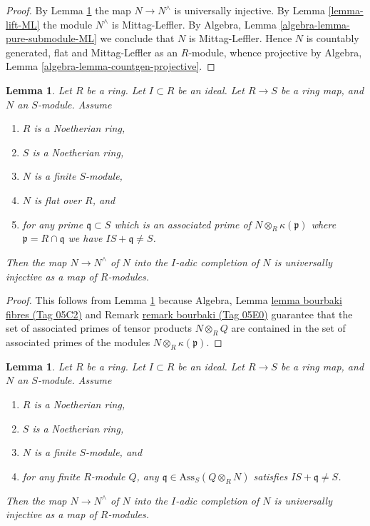 \documentclass{amsart}
\theoremstyle{plain}
\newtheorem{lemma}[subsection]{Lemma}
\theoremstyle{definition}
\theoremstyle{remark}
\numberwithin{equation}{subsection}
\begin{document}
\begin{proof}
By
Lemma \ref{lemma-universally-injective-to-completion-flat}
the map $N \to N^\wedge$ is universally injective.
By
Lemma \ref{lemma-lift-ML}
the module $N^\wedge$ is Mittag-Leffler.
By
Algebra, Lemma \ref{algebra-lemma-pure-submodule-ML}
we conclude that $N$ is Mittag-Leffler.
Hence $N$ is countably generated, flat and Mittag-Leffler as an $R$-module,
whence projective by
Algebra, Lemma \ref{algebra-lemma-countgen-projective}.
\end{proof}


\begin{lemma}
\label{lemma-universally-injective-to-completion-flat}
Let $R$ be a ring.
Let $I \subset R$ be an ideal.
Let $R \to S$ be a ring map, and $N$ an $S$-module.
Assume
\begin{enumerate}
\item $R$ is a Noetherian ring,
\item $S$ is a Noetherian ring,
\item $N$ is a finite $S$-module,
\item $N$ is flat over $R$, and
\item for any prime $\mathfrak q \subset S$ which is an associated prime of
$N \otimes_R \kappa(\mathfrak p)$ where $\mathfrak p = R \cap \mathfrak q$
we have $IS + \mathfrak q \not = S$.
\end{enumerate}
Then the map $N \to N^\wedge$ of $N$ into the $I$-adic completion of $N$
is universally injective as a map of $R$-modules.
\end{lemma}

\begin{proof}
This follows from
Lemma \ref{lemma-universally-injective-to-completion}
because
Algebra, Lemma
\href{https://stacks.math.columbia.edu/tag/05C2}{lemma bourbaki fibres (Tag 05C2)} and
Remark \href{https://stacks.math.columbia.edu/tag/05E0}{remark bourbaki (Tag 05E0)}
guarantee that the set of associated primes of tensor products
$N \otimes_R Q$ are contained in the set of associated primes of
the modules $N \otimes_R \kappa(\mathfrak p)$.
\end{proof}


\begin{lemma}
\label{lemma-universally-injective-to-completion}
Let $R$ be a ring.
Let $I \subset R$ be an ideal.
Let $R \to S$ be a ring map, and $N$ an $S$-module.
Assume
\begin{enumerate}
\item $R$ is a Noetherian ring,
\item $S$ is a Noetherian ring,
\item $N$ is a finite $S$-module, and
\item for any finite $R$-module $Q$, any
$\mathfrak q \in \text{Ass}_S(Q \otimes_R N)$
satisfies $IS + \mathfrak q \not = S$.
\end{enumerate}
Then the map $N \to N^\wedge$ of $N$ into the $I$-adic completion of $N$
is universally injective as a map of $R$-modules.
\end{lemma}
\end{document}
